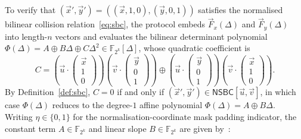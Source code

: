 \documentclass[11pt,a4paper]{article}
\theoremstyle{definition}
\theoremstyle{remark}
\newcommand{\Ftwok}{\mathbb{F}_{2^k}}
\newcommand{\NSBC}{\mathsf{NSBC}}
\begin{document}
To verify that $(\vec{x}', \vec{y}') = ((\vec{x}, 1, 0), (\vec{y}, 0, 1))$ satisfies the normalised bilinear collision relation~\eqref{eq:sbc}, the protocol embeds $\vec{F}_x(\Delta)$ and $\vec{F}_y(\Delta)$ into length-$n$ vectors and evaluates the bilinear determinant polynomial $\Phi(\Delta) = A \oplus B\Delta \oplus C\Delta^2 \in \Ftwok[\Delta]$, whose quadratic coefficient is
\begin{equation}
\label{eq:C-coeff}
C = \left(\vec{u} \cdot \begin{pmatrix} \vec{x} \\ 1 \\ 0 \end{pmatrix}\right) \left(\vec{v} \cdot \begin{pmatrix} \vec{y} \\ 0 \\ 1 \end{pmatrix}\right) \oplus \left(\vec{u} \cdot \begin{pmatrix} \vec{y} \\ 0 \\ 1 \end{pmatrix}\right) \left(\vec{v} \cdot \begin{pmatrix} \vec{x} \\ 1 \\ 0 \end{pmatrix}\right).
\end{equation}
By Definition~\ref{def:sbc}, $C = 0$ if and only if $(\vec{x}', \vec{y}') \in \NSBC[\vec{u}, \vec{v}]$, in which case $\Phi(\Delta)$ reduces to the degree-$1$ affine polynomial $\Phi(\Delta) = A \oplus B\Delta$. Writing $\eta \in \{0, 1\}$ for the normalisation-coordinate mask padding indicator, the constant term $A \in \Ftwok$ and linear slope $B \in \Ftwok$ are given by~\cite{HJ25}:
\end{document}
